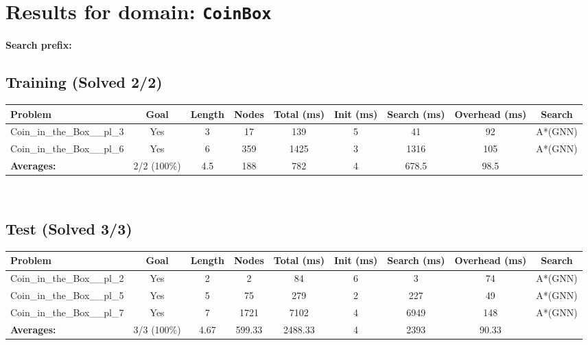 \documentclass{article}
\begin{document}
\section*{Results for domain: \texttt{CoinBox}}
\textbf{Search prefix:} 
\\[0.5cm]
\subsection*{Training (Solved 2/2)}
\begin{tabular}{lcccccccc}
\toprule
Problem & Goal & Length & Nodes & Total (ms) & Init (ms) & Search (ms) & Overhead (ms) & Search \\
\midrule
Coin\_in\_the\_Box\_\_pl\_3 & Yes & 3 & 17 & 139 & 5 & 41 & 92 & A*(GNN) \\
Coin\_in\_the\_Box\_\_pl\_6 & Yes & 6 & 359 & 1425 & 3 & 1316 & 105 & A*(GNN) \\
\textbf{Averages:} & 2/2 (100\%) & 4.5 & 188 & 782 & 4 & 678.5 & 98.5 & \\
\bottomrule
\end{tabular}
\\[0.7cm]
\subsection*{Test (Solved 3/3)}
\begin{tabular}{lcccccccc}
\toprule
Problem & Goal & Length & Nodes & Total (ms) & Init (ms) & Search (ms) & Overhead (ms) & Search \\
\midrule
Coin\_in\_the\_Box\_\_pl\_2 & Yes & 2 & 2 & 84 & 6 & 3 & 74 & A*(GNN) \\
Coin\_in\_the\_Box\_\_pl\_5 & Yes & 5 & 75 & 279 & 2 & 227 & 49 & A*(GNN) \\
Coin\_in\_the\_Box\_\_pl\_7 & Yes & 7 & 1721 & 7102 & 4 & 6949 & 148 & A*(GNN) \\
\textbf{Averages:} & 3/3 (100\%) & 4.67 & 599.33 & 2488.33 & 4 & 2393 & 90.33 & \\
\bottomrule
\end{tabular}
\\[0.7cm]
\end{document}
